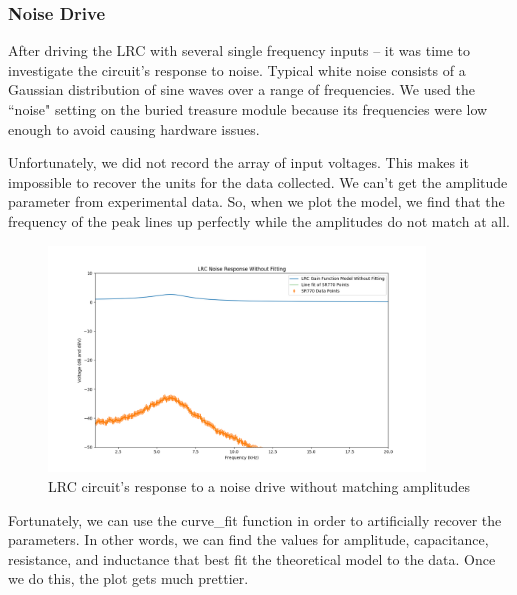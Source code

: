 \documentclass{article}
\begin{document}
\subsubsection{Noise Drive}%
\label{ssub:noise_drive}

After driving the LRC with several single frequency inputs -- it was time to
investigate the circuit's response to noise. Typical white noise consists of a
Gaussian distribution of sine waves over a range of frequencies. We used the
``noise" setting on the buried treasure module because its frequencies were low
enough to avoid causing hardware issues.

Unfortunately, we did not record the array of input voltages. This makes it
impossible to recover the units for the data collected. We can't get the
amplitude parameter from experimental data. So, when we plot the model, we find
that the frequency of the peak lines up perfectly while the amplitudes do not
match at all.

\begin{figure}[H]
    \centering
\begin{minipage}{11cm}
\begin{tcolorbox}
    \centering
        \includegraphics[width=10cm, height=6cm]{figures/figure22.png}
        \caption{LRC circuit's response to a noise drive without matching
        amplitudes}
        \label{fig:fig22}
\end{tcolorbox}
\end{minipage}
\end{figure}

Fortunately, we can use the curve\_fit function in order to artificially
recover the parameters. In other words, we can find the values for amplitude,
capacitance, resistance, and inductance that best fit the theoretical model to
the data. Once we do this, the plot gets much prettier.
\end{document}
